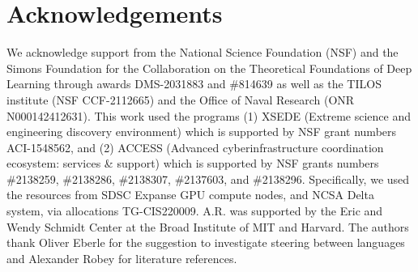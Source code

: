\section*{Acknowledgements}
We acknowledge support from the National Science Foundation (NSF) and the Simons Foundation for the Collaboration on the Theoretical Foundations of Deep Learning through awards DMS-2031883 and \#814639 as well as the  TILOS institute (NSF CCF-2112665) and the Office of Naval Research (ONR N000142412631). 
This work used the programs (1) XSEDE (Extreme science and engineering discovery environment)  which is supported by NSF grant numbers ACI-1548562, and (2) ACCESS (Advanced cyberinfrastructure coordination ecosystem: services \& support) which is supported by NSF grants numbers \#2138259, \#2138286, \#2138307, \#2137603, and \#2138296. Specifically, we used the resources from SDSC Expanse GPU compute nodes, and NCSA Delta system, via allocations TG-CIS220009. 
A.R. was supported by the Eric and Wendy Schmidt Center at the Broad Institute of MIT and Harvard.  The authors thank  Oliver Eberle for the suggestion to investigate steering between languages  and Alexander Robey for literature references. 
